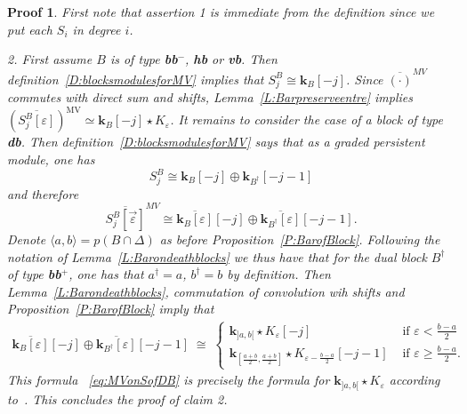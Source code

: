 \documentclass[a4paper, english, 11pt]{article}
\newcommand{\kk}[0]{\textbf{k}}
\newcommand{\0}{\vec{0}}
\newcommand{\MV}{\text{MV}}
\newtheorem*{pf}{Proof} }
\begin{document}
\begin{pf}
First note that assertion 1 is immediate from the definition since we put each $S_i$ in degree $i$.   


\smallskip 

2. First assume $B$ is of type  \textbf{bb$^-$}, \textbf{hb} or \textbf{vb}. Then  definition~\ref{D:blocksmodulesforMV} implies that $S_j^B \cong \kk_B[-j]$. Since  $\overline{(\cdot)}^{MV}$ commutes with direct 
sum and shifts, Lemma~\ref{L:Barpreserveentre} implies $(\overline{S_j^B [\varepsilon]})^{\MV} \simeq \kk_B[-j] \star K_\varepsilon $. It remains to consider the case of a block of type \textbf{db}. Then definition~\ref{D:blocksmodulesforMV} says that as a graded persistent module, one has $$S_j^B \cong \kk_B[-j] \oplus \kk_{B^\dagger}[-j-1]$$ and therefore  $$\overline{S_j^B[\vec{\varepsilon}]}^{MV} \cong \overline{\kk_B[\varepsilon]}[-j] \oplus \overline{\kk_{B^\dagger}[\varepsilon]}[-j-1].$$ Denote $\langle a, b\rangle =p(B \cap \Delta)$ as before Proposition~\ref{P:BarofBlock}. Following the notation of 
Lemma~\ref{L:Barondeathblocks} we thus have that for the dual block $B^\dagger$ of type \textbf{bb}$^{+}$, one has that $a^\dagger=a$, $b^\dagger=b$ by definition. Then Lemma~\ref{L:Barondeathblocks}, commutation of convolution wih shifts and Proposition~\ref{P:BarofBlock} imply that 
\begin{multline}\label{eq:MVonSofDB}
\overline{\kk_B[\varepsilon]}[-j] \oplus \overline{\kk_{B^\dagger}[\varepsilon]}[-j-1] \;
  \cong \;\left\{ \begin{array}{ll}  \kk_{]a,b[}\star K_{\varepsilon}[-j] & \mbox{ if $\varepsilon< \frac{b-a}{2}$}\\
 \kk_{[\frac{a+b}{2}, \frac{a+b}{2}]}\star K_{\varepsilon -\frac{b -a}{2}} [-j-1] & \mbox{ if $\varepsilon \geqslant \frac{b-a}{2}$.} \end{array}   \right .
\end{multline}
This formula ~\eqref{eq:MVonSofDB} is precisely the formula for $\kk_{]a,b[}\star K_{\varepsilon}$ according to~\cite[Proposition 3.8]{Berk18}. This concludes the proof of claim 2.

\smallskip


\end{pf}
\end{document}
